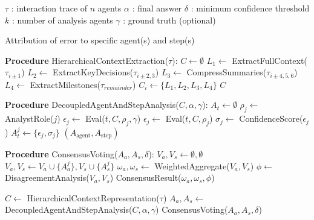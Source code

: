 \documentclass{article}
\begin{document}
\begin{algorithm}[H]
\caption{ECHO: Error Attribution through Contextual Hierarchy and Objective Consensus Analysis}
\begin{algorithmic}[1]
\vspace{0.5cm}
\REQUIRE
    \STATE $\tau$ : interaction trace of $n$ agents
    \STATE $\alpha$ : final answer
    \STATE $\delta$ : minimum confidence threshold
    \STATE $k$ : number of analysis agents
    \STATE $\gamma$ : ground truth (optional)
\vspace{0.4cm}

\ENSURE Attribution of error to specific agent(s) and step(s)

\vspace{0.5cm}

\STATE \textbf{Procedure} HierarchicalContextExtraction($\tau$):
    \STATE $C \leftarrow \emptyset$ 
        \STATE $L_1 \leftarrow$ ExtractFullContext($\tau_{i\pm1}$)
        \STATE $L_2 \leftarrow$ ExtractKeyDecisions($\tau_{i\pm2,3}$)
        \STATE $L_3 \leftarrow$ CompressSummaries($\tau_{i\pm4,5,6}$)
        \STATE $L_4 \leftarrow$ ExtractMilestones($\tau_{remainder}$)
        \STATE $C_i \leftarrow \{L_1, L_2, L_3, L_4\}$
    \ENDFOR
    \RETURN $C$

\vspace{0.5cm}

\STATE \textbf{Procedure} DecoupledAgentAndStepAnalysis($C, \alpha, \gamma$):
        \STATE $A_t \leftarrow \emptyset$ 
            \STATE $\rho_j \leftarrow$ AnalystRole($j$)
                \STATE $\epsilon_j \leftarrow$ Eval($t, C, \rho_j, \gamma$)
            \ELSE
                \STATE $\epsilon_j \leftarrow$ Eval($t, C, \rho_j$)
            \ENDIF
            \STATE $\sigma_j \leftarrow$ ConfidenceScore($\epsilon_j$)
            \STATE $A_t^j \leftarrow \{\epsilon_j, \sigma_j\}$
        \ENDFOR
    \ENDFOR
    \RETURN $(A_{\text{agent}}, A_{\text{step}})$

\vspace{0.5cm}

\STATE \textbf{Procedure} ConsensusVoting($A_a, A_s, \delta$):
    \STATE $V_a, V_s \leftarrow \emptyset, \emptyset$ 
            \STATE $V_a, V_s \leftarrow V_a \cup \{A_a^j\}, V_s \cup \{A_s^j\}$
        \ENDIF
    \ENDFOR
    \STATE $\omega_a, \omega_s \leftarrow$ WeightedAggregate($V_a, V_s$)
    \STATE $\phi \leftarrow$ DisagreementAnalysis($V_a, V_s$)
    \RETURN ConsensusResult($\omega_a, \omega_s, \phi$)

\vspace{0.5cm}

\STATE $C \leftarrow$ HierarchicalContextRepresentation($\tau$)
\STATE $A_a, A_s \leftarrow$ DecoupledAgentAndStepAnalysis($C, \alpha, \gamma$)
\RETURN ConsensusVoting($A_a, A_s, \delta$)
\end{algorithmic}
\end{algorithm}
\end{document}
